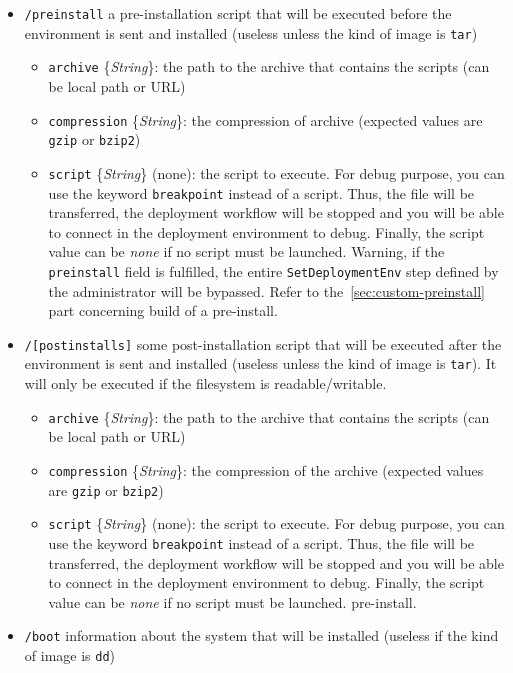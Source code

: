 \documentclass[a4wide,10pt,oneside]{book}
\newcommand{\ypath}[1]{\texttt{#1}}
\newcommand{\yfield}[2]{\texttt{#1} {\small\{{\emph{#2}}\}}:}
\newcommand{\yfieldd}[3]{\texttt{#1} {\small\{{\emph{#2}}\}} {\small(}#3{\small)}:}
\begin{document}
\begin{itemize}
\begin{itemize}
  \end{itemize}
  \item \ypath{/preinstall} a pre-installation script that will be executed before the environment is sent and installed (useless unless the kind of image is \texttt{tar})
  \begin{itemize}
    \item \yfield{archive}{String} the path to the archive that contains the scripts (can be local path or URL)
    \item \yfield{compression}{String} the compression of archive (expected values are \texttt{gzip} or \texttt{bzip2})
    \item \yfieldd{script}{String}{none} the script to execute. For debug purpose, you can use the keyword \texttt{breakpoint} instead of a script. Thus, the file will be transferred, the deployment workflow will be stopped and you will be able to connect in the deployment environment to debug. Finally, the script value can be \textit{none} if no script must be launched. Warning, if the \texttt{preinstall} field is fulfilled, the entire \texttt{SetDeploymentEnv} step defined by the administrator will be bypassed. Refer to the~\ref{sec:custom-preinstall} part concerning build of a pre-install.
  \end{itemize}
  \item \ypath{/[postinstalls]} some post-installation script that will be executed after the environment is sent and installed (useless unless the kind of image is \texttt{tar}). It will only be executed if the filesystem is readable/writable.
  \begin{itemize}
    \item \yfield{archive}{String} the path to the archive that contains the scripts (can be local path or URL)
    \item \yfield{compression}{String} the compression of the archive (expected values are \texttt{gzip} or \texttt{bzip2})
    \item \yfieldd{script}{String}{none} the script to execute. For debug purpose, you can use the keyword \texttt{breakpoint} instead of a script. Thus, the file will be transferred, the deployment workflow will be stopped and you will be able to connect in the deployment environment to debug. Finally, the script value can be \textit{none} if no script must be launched. pre-install.
  \end{itemize}
  \item \ypath{/boot} information about the system that will be installed (useless if the kind of image is \texttt{dd})

\end{itemize}
\end{document}
